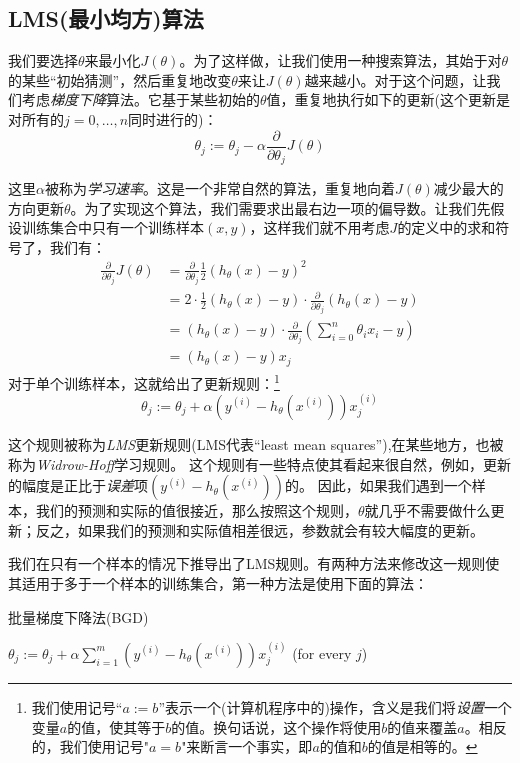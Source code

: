 \documentclass[hyperref, UTF8]{ctexart}
\begin{document}
\subsection{LMS(最小均方)算法}
我们要选择$\theta$来最小化$J(\theta)$。为了这样做，让我们使用一种搜索算法，其始于对$\theta$的某些“初始猜测”，然后重复地改变$\theta$来让$J(\theta)$越来越小。对于这个问题，让我们考虑\emph{梯度下降}算法。它基于某些初始的$\theta$值，重复地执行如下的更新(这个更新是对所有的$j = 0,\dots,n$同时进行的)：
\begin{equation*}
\theta_j := \theta_j - \alpha\frac{\partial}{\partial\theta_j}J(\theta)
\end{equation*}

这里$\alpha$被称为\emph{学习速率}。这是一个非常自然的算法，重复地向着$J(\theta)$减少最大的方向更新$\theta$。为了实现这个算法，我们需要求出最右边一项的偏导数。让我们先假设训练集合中只有一个训练样本$(x, y)$，这样我们就不用考虑$J$的定义中的求和符号了，我们有：
\begin{equation}
\begin{split}
\frac{\partial}{\partial\theta_j}J(\theta) &= \frac{\partial}{\partial\theta_j}\frac{1}{2}(h_\theta(x) - y)^2 \\
&= 2\cdot\frac{1}{2}(h_\theta(x) - y)\cdot\frac{\partial}{\partial\theta_j}(h_\theta(x) - y) \\
&= (h_\theta(x) - y)\cdot\frac{\partial}{\partial\theta_j}(\sum_{i = 0}^n\theta_ix_i - y) \\
&= (h_\theta(x) - y)x_j
\end{split}
\end{equation}
对于单个训练样本，这就给出了更新规则：\footnote{我们使用记号“$a := b$”表示一个(计算机程序中的)操作，含义是我们将\emph{设置}一个变量$a$的值，使其等于$b$的值。换句话说，这个操作将使用$b$的值来覆盖$a$。相反的，我们使用记号"$a = b$"来断言一个事实，即$a$的值和$b$的值是相等的。}
\begin{equation*}
\theta_j := \theta_j + \alpha(y^{(i)} - h_\theta(x^{(i)}))x^{(i)}_j
\end{equation*}

这个规则被称为\emph{LMS}更新规则(LMS代表``least mean squares''),在某些地方，也被称为\emph{Widrow-Hoff}学习规则。
这个规则有一些特点使其看起来很自然，例如，更新的幅度是正比于\emph{误差}项$(y^{(i)} - h_\theta(x^{(i)}))$的。
因此，如果我们遇到一个样本，我们的预测和实际的值很接近，那么按照这个规则，$\theta$就几乎不需要做什么更新；反之，如果我们的预测和实际值相差很远，参数就会有较大幅度的更新。

我们在只有一个样本的情况下推导出了LMS规则。有两种方法来修改这一规则使其适用于多于一个样本的训练集合，第一种方法是使用下面的算法：
\begin{algorithm}
\caption{批量梯度下降法(BGD)}  
\begin{algorithmic}    
\REPEAT  
\STATE $\theta_j := \theta_j + \alpha\sum_{i = 1}^m(y^{(i)} - h_\theta(x^{(i)}))x^{(i)}_j$ (for every $j$)
\end{algorithmic}  
\end{algorithm}
\end{document}
